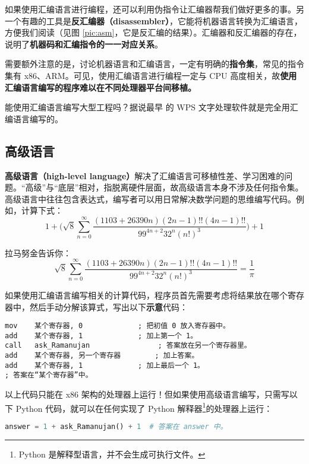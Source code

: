 如果使用汇编语言进行编程，还可以利用伪指令让汇编器帮我们做好更多的事。另一个有趣的工具是\textbf{反汇编器（disassembler）}，它能将机器语言转换为汇编语言，方便我们阅读（见图 \ref{pic:asm}，它是反汇编的结果）。汇编器和反汇编器的存在，说明了\textbf{机器码和汇编指令的一一对应关系}。

需要额外注意的是，讨论机器语言和汇编语言，一定有明确的\textbf{指令集}，常见的指令集有 x86、ARM。可见，使用汇编语言进行编程一定与 CPU 高度相关，故\textbf{使用汇编语言编写的程序难以在不同处理器平台间移植。}

\begin{note}
	能使用汇编语言编写大型工程吗？据说最早 的 WPS 文字处理软件就是完全用汇编语言编写的。
\end{note}

\subsection{高级语言}

\textbf{高级语言（high-level language）}解决了汇编语言可移植性差、学习困难的问题。“高级”与“底层”相对，指脱离硬件层面，故高级语言本身不涉及任何指令集。高级语言中往往包含表达式，编写者可以用日常解决数学问题的思维编写代码。例如，计算下式：
$$
1 + \biggl( \sqrt{8} \sum\limits_{n = 0}^\infty \dfrac{(1103 + 26390 n) (2n - 1)!! (4n - 1)!!}{99^{4n + 2} 32^n (n!)^3} \biggr) + 1
$$

拉马努金告诉你：
$$
\sqrt{8} \sum\limits_{n = 0}^\infty \dfrac{(1103 + 26390 n) (2n - 1)!! (4n - 1)!!}{99^{4n + 2} 32^n (n!)^3} = \dfrac{1}{\pi}
$$

如果使用汇编语言编写相关的计算代码，程序员首先需要考虑将结果放在哪个寄存器中，然后手动分解该算式，写出以下\textbf{示意}代码：

\begin{lstlisting}[language=assembly, numbers=none]
mov    某个寄存器, 0				; 把初值 0 放入寄存器中。
add    某个寄存器, 1				; 加上第一个 1。
call   ask_Ramanujan				; 答案放在另一个寄存器里。
add    某个寄存器, 另一个寄存器		; 加上答案。
add    某个寄存器, 1				; 加上最后一个 1。
; 答案在“某个寄存器”中。
\end{lstlisting}

以上代码只能在 x86 架构的处理器上运行！但如果使用高级语言编写，只需写以下 Python
代码，就可以在任何实现了 Python 解释器\footnote{Python 是解释型语言，并不会生成可执行文件。}的处理器上运行：

\begin{lstlisting}[language=Python, numbers=none, emph={[2]ask_Ramanujan}]
answer = 1 + ask_Ramanujan() + 1  # 答案在 answer 中。
\end{lstlisting}

